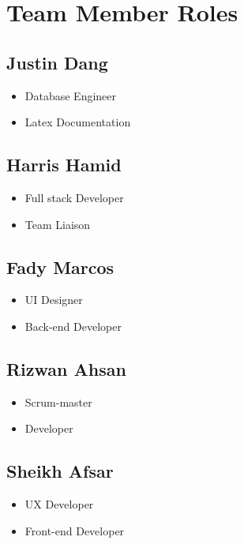 \documentclass{article}
\begin{document}
\section{Team Member Roles}

\subsection*{Justin Dang}

\begin{itemize}
	\item Database Engineer
    \item Latex Documentation
\end{itemize}

\subsection*{Harris Hamid}

\begin{itemize}
	\item Full stack Developer
	\item Team Liaison
\end{itemize}

\subsection*{Fady Marcos}

\begin{itemize}
    \item UI Designer
	\item  Back-end Developer
\end{itemize}

\subsection*{Rizwan Ahsan}

\begin{itemize}
    \item Scrum-master
	\item Developer
\end{itemize}

\subsection*{Sheikh Afsar}

\begin{itemize}
	\item UX Developer
    \item Front-end Developer
\end{itemize}
\end{document}
